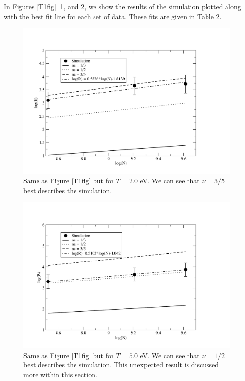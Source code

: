 \documentclass{article}
\begin{document}
\begin{multicols}{2}
In Figures \ref{T1fig}, \ref{T2fig}, and \ref{T5fig}, we show the results of the simulation plotted along with the best fit line for each set of data.  These fits are given in Table 2.  \\

\begin{figure}[H]
\begin{center}
\includegraphics[width=\linewidth]{Figures/T2plot.pdf}
\caption{Same as Figure \ref{T1fig} but for $T=2.0$ eV.  We can see that $\nu = 3/5$ best describes the simulation.}
\label{T2fig}
\end{center}
\end{figure}

\begin{figure}[H]
\begin{center}
\includegraphics[width=\linewidth]{Figures/T5plot.pdf}
\caption{Same as Figure \ref{T1fig} but for $T=5.0$ eV.  We can see that $\nu = 1/2$ best describes the simulation.  This unexpected result is discussed more within this section.}
\label{T5fig}
\end{center}
\end{figure}


\end{multicols}
\end{document}
